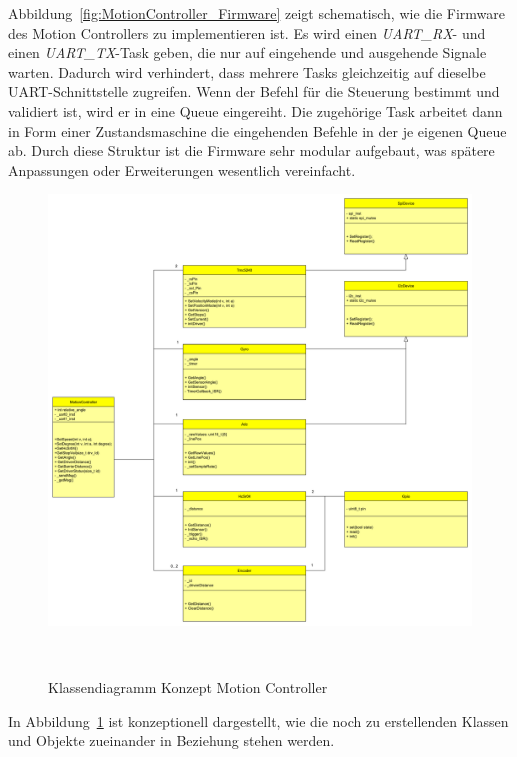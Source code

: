 \documentclass[main.tex]{subfiles} %
\begin{document}
Abbildung~\ref{fig:MotionController_Firmware} zeigt schematisch, wie die
Firmware des Motion Controllers zu implementieren ist. Es wird einen
\textit{UART\_RX}- und einen \textit{UART\_TX}-Task geben, die nur auf
eingehende und ausgehende Signale warten. Dadurch wird verhindert, dass mehrere
Tasks gleichzeitig auf dieselbe UART-Schnittstelle zugreifen. Wenn der Befehl
für die Steuerung bestimmt und validiert ist, wird er in eine Queue eingereiht.
Die zugehörige Task arbeitet dann in Form einer Zustandsmaschine die
eingehenden Befehle in der je eigenen Queue ab. Durch diese Struktur ist die
Firmware sehr modular aufgebaut, was spätere Anpassungen oder Erweiterungen
wesentlich vereinfacht.

\begin{figure}[H]
    \centering
    \includegraphics[width = 1\linewidth]{fig_Antriebe_und_Dimensionierung/Konzept_ClassDiagramm.pdf}
    \caption{Klassendiagramm Konzept Motion Controller}~\label{fig:MotionController_ClassDiagramm}
\end{figure}

In Abbildung~\ref{fig:MotionController_ClassDiagramm} ist konzeptionell
dargestellt, wie die noch zu erstellenden Klassen und Objekte zueinander in
Beziehung stehen werden.
\end{document}
